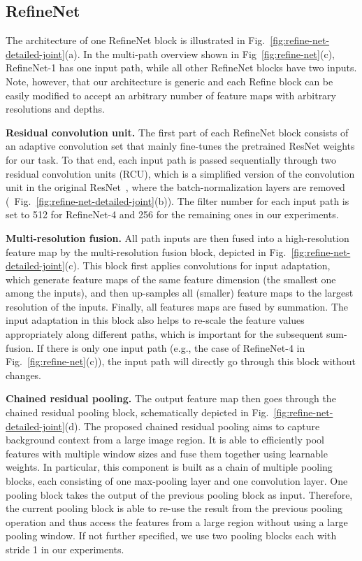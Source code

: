 \documentclass[10pt,twocolumn,letterpaper]{article}
\newcommand{\Fig}{Fig.\xspace}
\newcommand{\myparagraph}[1]{\vspace{.5em}\noindent\textbf{#1}}
\newcommand{\refOurFig}{\ref{fig:refine-net}(c)\xspace}
\begin{document}
\subsection{RefineNet}
\label{sec:refinet_details}

The architecture of one RefineNet block is illustrated in Fig.~\ref{fig:refine-net-detailed-joint}(a).
In the multi-path overview shown in Fig~\refOurFig,  
RefineNet-1 has one input path, while all other RefineNet blocks have two inputs. Note, however, that our architecture is generic and each Refine block can be easily modified to accept an arbitrary number of feature maps with arbitrary resolutions and depths.

\myparagraph{Residual convolution unit.}
The first part of each RefineNet block consists of an adaptive convolution set that  mainly fine-tunes the pretrained ResNet weights for our task. To that end, each input path is passed sequentially through two residual convolution units (RCU), which is a simplified version of the convolution unit in the original ResNet~\cite{He:2016:ResNet}, where the batch-normalization layers are removed (\cf~\Fig~\ref{fig:refine-net-detailed-joint}(b)). The filter number for each input path is set to 512  for \mbox{RefineNet-4} and 256 for the remaining ones in our experiments.

\myparagraph{Multi-resolution fusion.}
All path inputs are then fused into a high-resolution feature map by the multi-resolution fusion block, depicted in \Fig~\ref{fig:refine-net-detailed-joint}(c).
This block first applies convolutions for input adaptation, which generate feature maps of the same feature dimension (the smallest one among the inputs),
and then up-samples all (smaller) feature maps to the largest resolution of the inputs. Finally, all features maps are fused by summation.
The input adaptation in this block also helps to re-scale the feature values appropriately along different paths, which is important for the subsequent sum-fusion.
If there is only one input path (e.g., the case of RefineNet-4 in \Fig~\ref{fig:refine-net}(c)), the input path will directly go through this block without changes.





\myparagraph{Chained residual pooling.}
The output feature map then goes through the chained residual pooling block, schematically depicted in \Fig~\ref{fig:refine-net-detailed-joint}(d).
The proposed chained residual pooling aims to capture background context from a large image region.
It is able to efficiently pool features with multiple window sizes and fuse them together using learnable weights.
In particular, this component is built as a chain of multiple pooling blocks, each consisting of one max-pooling layer and one convolution layer.
One pooling block takes the output of the previous pooling block as input. 
Therefore, the current pooling block is able to re-use the result from the previous pooling operation and thus access the features from a large region without using a large pooling window.
If not further specified, we use two pooling blocks each with stride 1 in our experiments.
\end{document}
